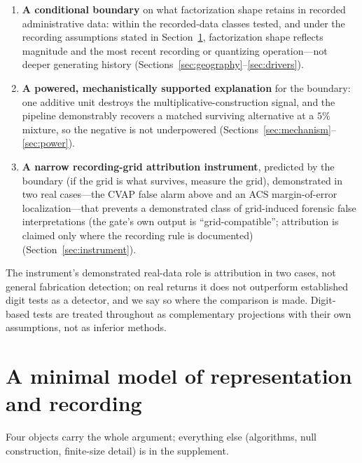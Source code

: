 \documentclass[12pt]{article}
\begin{document}
\begin{enumerate}
\item \textbf{A conditional boundary} on what factorization shape retains in
recorded administrative data: within the recorded-data classes tested, and
under the recording assumptions stated in Section~\ref{sec:model},
factorization shape reflects magnitude and the most recent recording or
quantizing operation---not deeper generating history
(Sections~\ref{sec:geography}--\ref{sec:drivers}).
\item \textbf{A powered, mechanistically supported explanation} for the
boundary: one additive unit destroys the multiplicative-construction signal,
and the pipeline demonstrably recovers a matched surviving alternative at a
$5\%$ mixture, so the negative is not underpowered
(Sections~\ref{sec:mechanism}--\ref{sec:power}).
\item \textbf{A narrow recording-grid attribution instrument}, predicted by
the boundary (if the grid is what survives, measure the grid), demonstrated in
two real cases---the CVAP false alarm above and an ACS margin-of-error
localization---that prevents a demonstrated class of grid-induced forensic
false interpretations (the gate's own output is ``grid-compatible'';
attribution is claimed only where the recording rule is documented)
(Section~\ref{sec:instrument}).
\end{enumerate}

The instrument's demonstrated real-data role is attribution in two cases, not
general fabrication detection; on real returns it does not outperform
established digit tests as a detector, and we say so where the comparison is
made. Digit-based tests are treated throughout as complementary projections
with their own assumptions, not as inferior methods.

\section{A minimal model of representation and recording}
\label{sec:model}

Four objects carry the whole argument; everything else (algorithms, null
construction, finite-size detail) is in the supplement.
\end{document}
